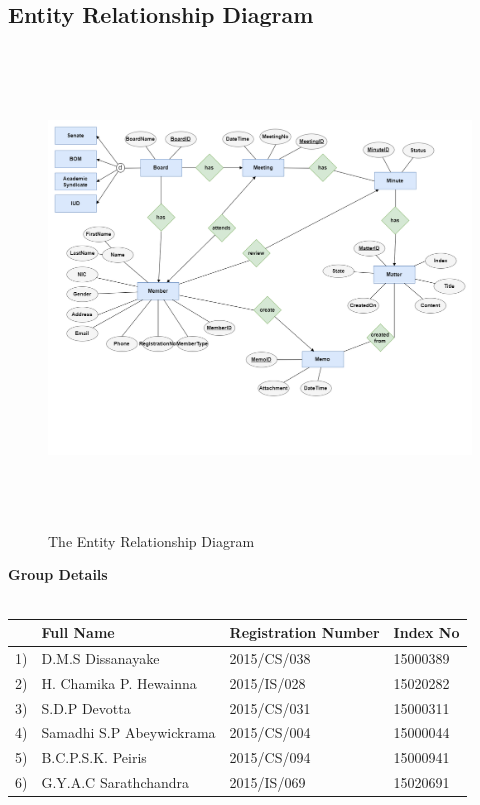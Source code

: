 \documentclass[a4paper,beamer]{article}
\begin{document}
		\clearpage
		\newpage

	\subsection{Entity Relationship Diagram}
		\vspace{2cm}
		\begin{figure}[h]
			\begin{center}
				\includegraphics[width=6in,height=5in]{img/entity-relationship-diagram}
			\end{center}
			\caption{The Entity Relationship Diagram}
			\label{fig:ERD}
		\end{figure}
		\newpage  
	
		\textbf{Group Details}\\
		\vspace{1cm}\\	
				\bgroup
					\def\arraystretch{2}%
					\begin{tabular}{|p{.5cm}|p{5cm}|p{4cm}|p{3cm}|} \hline 
					  & \textbf{Full Name}  & \textbf{Registration Number} & \textbf{Index No } \\ \hline
					1) & D.M.S Dissanayake	 & 2015/CS/038 & 15000389\\ \hline
					2) & H. Chamika  P.  Hewainna & 2015/IS/028 & 15020282\\ \hline
					3) & S.D.P Devotta & 2015/CS/031 & 15000311\\ \hline
					4) & Samadhi S.P Abeywickrama & 2015/CS/004 & 15000044\\ \hline
					5) & B.C.P.S.K. Peiris	 & 2015/CS/094 & 15000941\\ \hline
					6) & G.Y.A.C Sarathchandra & 2015/IS/069 & 15020691\\ \hline
					\end{tabular} \\[.6cm]
				\egroup
	
\end{document}
